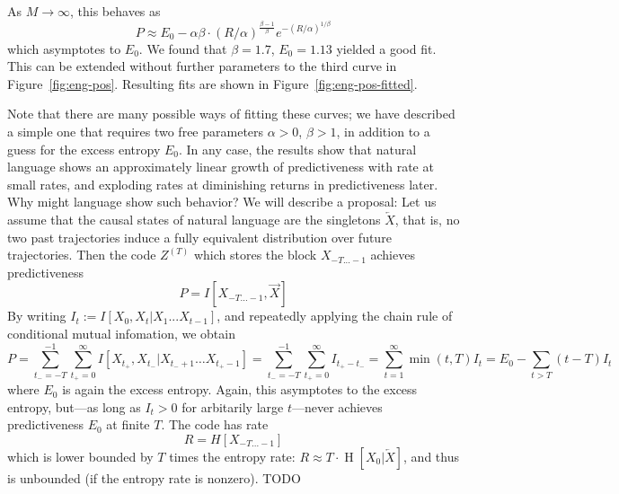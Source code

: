 \documentclass[11pt,letterpaper]{article}
\newif \ifcomment
\newcommand\rljf[1]{\ifcomment{{\color{blue}(#1)}}\else{}\fi}
\begin{document}
As $M \rightarrow \infty$, this behaves as
\begin{equation}
	P \approx E_0 - \alpha\beta \cdot (R/\alpha)^{\frac{\beta-1}{\beta}} e^{-(R/\alpha)^{1/\beta}}
\end{equation}
which asymptotes to $E_0$.
We found that $\beta = 1.7$, $E_0 = 1.13$ yielded a good fit.
This can be extended without further parameters to the third curve in Figure~\ref{fig:eng-pos}.
Resulting fits are shown in Figure~\ref{fig:eng-pos-fitted}.

Note that there are many possible ways of fitting these curves; we have described a simple one that requires two free parameters $\alpha >0$, $\beta > 1$, in addition to a guess for the excess entropy $E_0$.
In any case, the results show that natural language shows an approximately linear growth of predictiveness with rate at small rates, and exploding rates at diminishing returns in predictiveness later.
Why might language show such behavior?
We will describe a proposal:
Let us assume that the causal states of natural language are the singletons $\overleftarrow{X}$, that is, no two past trajectories induce a fully equivalent distribution over future trajectories.
Then the code $Z^{(T)}$ which stores the block $X_{-T...-1}$ achieves predictiveness \rljf{Write out what the min is doing logically: when $t$ exceeds $T$ we multiply only by $T$ (I'm not sure why). Also maybe subscript $P_T$}
\begin{equation}
	P =	I[X_{-T...-1}, \overrightarrow{X}]
\end{equation}
By writing $I_t := I[X_0, X_t | X_1 ... X_{t-1}]$, and repeatedly applying the chain rule of conditional mutual infomation, we obtain
\begin{equation}
	P = \sum_{t_- = -T}^{-1} \sum_{t_+ = 0}^\infty I[X_{t_+},X_{t_-}|X_{t_-+1}\dots X_{t_+-1}] = \sum_{t_- = -T}^{-1} \sum_{t_+ = 0}^\infty I_{t_+-t_-}  = \sum_{t=1}^\infty \min(t,T) I_t = E_0 - \sum_{t > T} (t-T) I_t
\end{equation}
where $E_0$ is again the excess entropy.
Again, this asymptotes to the excess entropy, but---as long as $I_t > 0$ for arbitarily large $t$---never achieves predictiveness $E_0$ at finite $T$.
The code has rate
\begin{equation}
	R =	H[X_{-T...-1}]
\end{equation}
which is lower bounded by $T$ times the entropy rate: $R \approx T \cdot \operatorname{H}[X_0|\overleftarrow{X}]$, and thus is unbounded (if the entropy rate is nonzero).
TODO \rljf{A few cites on previous work arguing about whether natural language has nonzero entropy rate. A conference paper by Ryosuke Takahira has a lit review}
\end{document}
